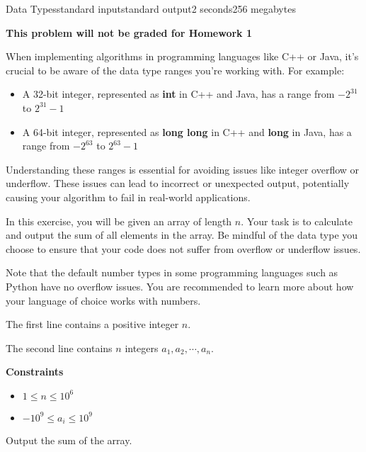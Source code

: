 \begin{problem}{Data Types}{standard input}{standard output}{2 seconds}{256 megabytes}

\textbf{This problem will not be graded for Homework 1} 

When implementing algorithms in programming languages like C++ or Java, it's crucial to be aware of the data type ranges you're working with. For example:

\begin{itemize}
\item A 32-bit integer, represented as \textbf{int} in C++ and Java,  has a range from $-2^{31}$ to $2^{31} - 1$
\item A 64-bit integer, represented as \textbf{long long} in C++ and \textbf{long} in Java, has a range from $-2^{63}$ to $2^{63}-1$
\end{itemize}

Understanding these ranges is essential for avoiding issues like integer overflow or underflow. These issues can lead to incorrect or unexpected output, potentially causing your algorithm to fail in real-world applications.

In this exercise, you will be given an array of length $n$. Your task is to calculate and output the sum of all elements in the array. Be mindful of the data type you choose to ensure that your code does not suffer from overflow or underflow issues.

Note that the default number types in some programming languages such as Python have no overflow issues. You are recommended to learn more about how your language of choice works with numbers.

\InputFile
The first line contains a positive integer $n$.

The second line contains $n$ integers $a_1, a_2, \cdots, a_n$.

\textbf{Constraints}
\begin{itemize}
    \item $1 \le n \le 10^6$
    \item $-10^9 \le a_i \le 10^9$
\end{itemize}

\OutputFile
Output the sum of the array.

\Example

\begin{example}
%
\end{example}

\end{problem}

